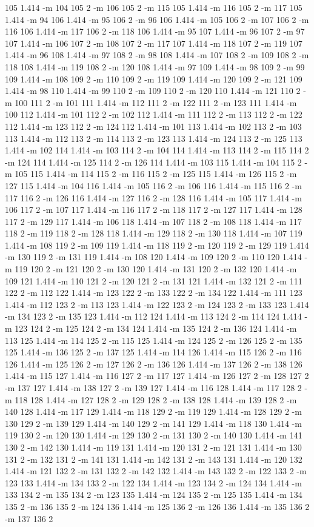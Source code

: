 \documentclass[12pt]{article}
\begin{document}
105 1.414 -m 104 105 2 -m 106 105 2 -m 115 105 1.414 -m 116 105 2 -m 117 105 1.414 -m 94 106 1.414 -m 95 106 2 -m 96 106 1.414 -m 105 106 2 -m 107 106 2 -m 116 106 1.414 -m 117 106 2 -m 118 106 1.414 -m 95 107 1.414 -m 96 107 2 -m 97 107 1.414 -m 106 107 2 -m 108 107 2 -m 117 107 1.414 -m 118 107 2 -m 119 107 1.414 -m 96 108 1.414 -m 97 108 2 -m 98 108 1.414 -m 107 108 2 -m 109 108 2 -m 118 108 1.414 -m 119 108 2 -m 120 108 1.414 -m 97 109 1.414 -m 98 109 2 -m 99 109 1.414 -m 108 109 2 -m 110 109 2 -m 119 109 1.414 -m 120 109 2 -m 121 109 1.414 -m 98 110 1.414 -m 99 110 2 -m 109 110 2 -m 120 110 1.414 -m 121 110 2 -m 100 111 2 -m 101 111 1.414 -m 112 111 2 -m 122 111 2 -m 123 111 1.414 -m 100 112 1.414 -m 101 112 2 -m 102 112 1.414 -m 111 112 2 -m 113 112 2 -m 122 112 1.414 -m 123 112 2 -m 124 112 1.414 -m 101 113 1.414 -m 102 113 2 -m 103 113 1.414 -m 112 113 2 -m 114 113 2 -m 123 113 1.414 -m 124 113 2 -m 125 113 1.414 -m 102 114 1.414 -m 103 114 2 -m 104 114 1.414 -m 113 114 2 -m 115 114 2 -m 124 114 1.414 -m 125 114 2 -m 126 114 1.414 -m 103 115 1.414 -m 104 115 2 -m 105 115 1.414 -m 114 115 2 -m 116 115 2 -m 125 115 1.414 -m 126 115 2 -m 127 115 1.414 -m 104 116 1.414 -m 105 116 2 -m 106 116 1.414 -m 115 116 2 -m 117 116 2 -m 126 116 1.414 -m 127 116 2 -m 128 116 1.414 -m 105 117 1.414 -m 106 117 2 -m 107 117 1.414 -m 116 117 2 -m 118 117 2 -m 127 117 1.414 -m 128 117 2 -m 129 117 1.414 -m 106 118 1.414 -m 107 118 2 -m 108 118 1.414 -m 117 118 2 -m 119 118 2 -m 128 118 1.414 -m 129 118 2 -m 130 118 1.414 -m 107 119 1.414 -m 108 119 2 -m 109 119 1.414 -m 118 119 2 -m 120 119 2 -m 129 119 1.414 -m 130 119 2 -m 131 119 1.414 -m 108 120 1.414 -m 109 120 2 -m 110 120 1.414 -m 119 120 2 -m 121 120 2 -m 130 120 1.414 -m 131 120 2 -m 132 120 1.414 -m 109 121 1.414 -m 110 121 2 -m 120 121 2 -m 131 121 1.414 -m 132 121 2 -m 111 122 2 -m 112 122 1.414 -m 123 122 2 -m 133 122 2 -m 134 122 1.414 -m 111 123 1.414 -m 112 123 2 -m 113 123 1.414 -m 122 123 2 -m 124 123 2 -m 133 123 1.414 -m 134 123 2 -m 135 123 1.414 -m 112 124 1.414 -m 113 124 2 -m 114 124 1.414 -m 123 124 2 -m 125 124 2 -m 134 124 1.414 -m 135 124 2 -m 136 124 1.414 -m 113 125 1.414 -m 114 125 2 -m 115 125 1.414 -m 124 125 2 -m 126 125 2 -m 135 125 1.414 -m 136 125 2 -m 137 125 1.414 -m 114 126 1.414 -m 115 126 2 -m 116 126 1.414 -m 125 126 2 -m 127 126 2 -m 136 126 1.414 -m 137 126 2 -m 138 126 1.414 -m 115 127 1.414 -m 116 127 2 -m 117 127 1.414 -m 126 127 2 -m 128 127 2 -m 137 127 1.414 -m 138 127 2 -m 139 127 1.414 -m 116 128 1.414 -m 117 128 2 -m 118 128 1.414 -m 127 128 2 -m 129 128 2 -m 138 128 1.414 -m 139 128 2 -m 140 128 1.414 -m 117 129 1.414 -m 118 129 2 -m 119 129 1.414 -m 128 129 2 -m 130 129 2 -m 139 129 1.414 -m 140 129 2 -m 141 129 1.414 -m 118 130 1.414 -m 119 130 2 -m 120 130 1.414 -m 129 130 2 -m 131 130 2 -m 140 130 1.414 -m 141 130 2 -m 142 130 1.414 -m 119 131 1.414 -m 120 131 2 -m 121 131 1.414 -m 130 131 2 -m 132 131 2 -m 141 131 1.414 -m 142 131 2 -m 143 131 1.414 -m 120 132 1.414 -m 121 132 2 -m 131 132 2 -m 142 132 1.414 -m 143 132 2 -m 122 133 2 -m 123 133 1.414 -m 134 133 2 -m 122 134 1.414 -m 123 134 2 -m 124 134 1.414 -m 133 134 2 -m 135 134 2 -m 123 135 1.414 -m 124 135 2 -m 125 135 1.414 -m 134 135 2 -m 136 135 2 -m 124 136 1.414 -m 125 136 2 -m 126 136 1.414 -m 135 136 2 -m 137 136 2 
\end{document}
